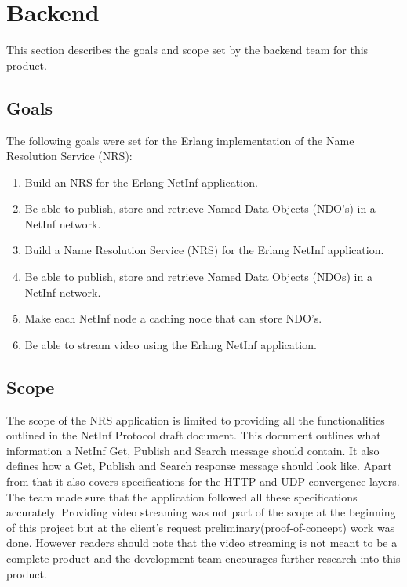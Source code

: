 \section{Backend}
This section describes the goals and scope set by the backend team for this product.

\subsection{Goals}
The following goals were set for the Erlang implementation of the Name Resolution Service (NRS):
\begin{enumerate}
<<<<<<< HEAD
 \item {Build an NRS for the Erlang NetInf application.}\\
 \item {Be able to publish, store and retrieve Named Data Objects (NDO's) in a NetInf network.}
 \item {Build a Name Resolution Service (NRS) for the Erlang NetInf application.}\\
 \item {Be able to publish, store and retrieve Named Data Objects (NDOs) in a NetInf network.}\
 \item {Make each NetInf node a caching node that can store NDO's.}\\
 \item {Be able to stream video using the Erlang NetInf application.}\\
  \end{enumerate}

\subsection{Scope}
The scope of the NRS application is limited to providing all the functionalities outlined in the NetInf Protocol draft document. \cite{netinfproto} This document outlines what information a NetInf Get, Publish and Search message should contain. It also defines how a Get, Publish and Search response message should look like. Apart from that it also covers specifications for the HTTP and UDP convergence layers. The team made sure that the application followed all these specifications accurately. Providing video streaming was not part of the scope at the beginning of this project but at the client's request preliminary(proof-of-concept) work was done. However readers should note that the video streaming is not meant to be a complete product and the development team encourages further research into this product.
